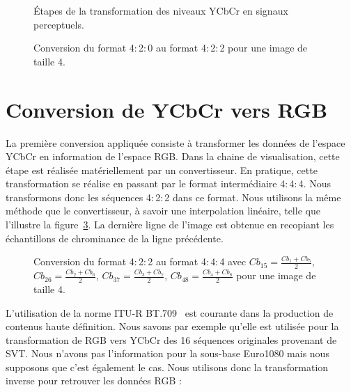 \begin{figure}[htbp]
	\centering
	\begin{tikzpicture}[node distance=3cm, text centered]\end{tikzpicture}
	\caption{Étapes de la transformation des niveaux YCbCr en signaux perceptuels.}
	\label{fig:transfoCouleursModel}
\end{figure}

\begin{figure}[htbp]
	\centering
	\begin{tikzpicture}[font=\footnotesize]\end{tikzpicture}
	\caption{Conversion du format 4$:$2$:$0 au format 4$:$2$:$2 pour une image de taille 4.}
	\label{fig:420Vers422}
\end{figure}


\section{Conversion de YCbCr vers RGB}
La première conversion appliquée consiste à transformer les données de l'espace YCbCr en information de l'espace RGB. Dans la chaine de visualisation, cette étape est réalisée matériellement par un convertisseur. En pratique, cette transformation se réalise en passant par le format intermédiaire 4$:$4$:$4. Nous transformons donc les séquences 4$:$2$:$2 dans ce format. Nous utilisons la même méthode que le convertisseur, à savoir une interpolation linéaire, telle que l'illustre la figure~\ref{fig:422Vers444}. La dernière ligne de l'image est obtenue en recopiant les échantillons de chrominance de la ligne précédente.

\begin{figure}[htbp]
	\centering
	\begin{tikzpicture}[font=\footnotesize]\end{tikzpicture}
	\caption{Conversion du format 4$:$2$:$2 au format 4$:$4$:$4 avec $Cb_{15} = \frac{Cb_1+Cb_5}{2}$, $Cb_{26} = \frac{Cb_2+Cb_6}{2}$, $Cb_{37} = \frac{Cb_3+Cb_7}{2}$, $Cb_{48} = \frac{Cb_4+Cb_8}{2}$ pour une image de taille 4.}
	\label{fig:422Vers444}
\end{figure}

L'utilisation de la norme ITU-R BT.709~\cite{itu-bt709-5} est courante dans la production de contenus haute définition. Nous savons par exemple qu'elle est utilisée pour la transformation de RGB vers YCbCr des 16 séquences originales provenant de SVT. Nous n'avons pas l'information pour la sous-base Euro1080 mais nous supposons que c'est également le cas. Nous utilisons donc la transformation inverse pour retrouver les données RGB :

